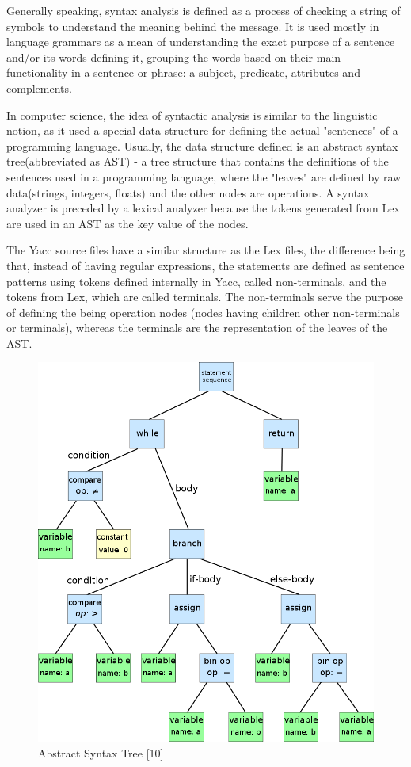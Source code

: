 \documentclass[12pt,a4paper,twoside]{report}
\begin{document}
Generally speaking, syntax analysis is defined as a process of checking a string of symbols to understand the meaning behind the message. It is used mostly in language grammars as a mean of understanding the exact purpose of a sentence and/or its words defining it, grouping the words based on their main functionality in a sentence or phrase: a subject, predicate, attributes and complements. 

In computer science, the idea of syntactic analysis is similar to the linguistic notion, as it used a special data structure for defining the actual "sentences" of a programming language. Usually, the data structure defined is an abstract syntax tree(abbreviated as AST) - a tree structure that contains the definitions of the sentences used in a programming language, where the "leaves" are defined by raw data(strings, integers, floats) and the other nodes are operations. A syntax analyzer is preceded by a lexical analyzer because the tokens generated from Lex are used in an AST as the key value of the nodes. 

The Yacc source files have a similar structure as the Lex files, the difference being that, instead of having regular expressions, the statements are defined as sentence patterns using tokens defined internally in Yacc, called non-terminals, and the tokens from Lex, which are called terminals. The non-terminals serve the purpose of defining the being operation nodes (nodes having children other non-terminals or terminals), whereas the terminals are the representation of the leaves of the AST. 


\begin{figure}[H]
	\centering
	\includegraphics[scale=0.45]{img/diags/AST.png}
	\caption{Abstract Syntax Tree [10]}
\end{figure}
\end{document}
